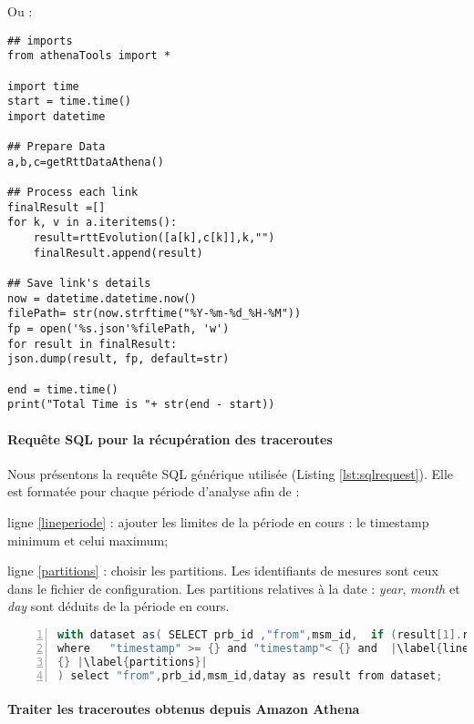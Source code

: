 \documentclass[]{report}
\begin{document}
Ou :
\begin{lstlisting}
## imports
from athenaTools import *

import time
start = time.time()
import datetime

## Prepare Data
a,b,c=getRttDataAthena()

## Process each link
finalResult =[]
for k, v in a.iteritems():
	result=rttEvolution([a[k],c[k]],k,"")
	finalResult.append(result)

## Save link's details
now = datetime.datetime.now()
filePath= str(now.strftime("%Y-%m-%d_%H-%M"))
fp = open('%s.json'%filePath, 'w')
for result in finalResult:
json.dump(result, fp, default=str)

end = time.time()
print("Total Time is "+ str(end - start))
\end{lstlisting}

\paragraph{Requête SQL pour la récupération des traceroutes} \label{sqlformat}

Nous présentons la requête SQL générique utilisée (Listing \ref{lst:sqlrequest}). Elle est formatée pour chaque période d'analyse afin de :
 
 ligne \ref{lineperiode} : ajouter les limites de la période en cours : le timestamp minimum et celui maximum;
 
 ligne \ref{partitions} : choisir les partitions. Les identifiants de mesures sont ceux dans le fichier de configuration. Les partitions relatives à la date : \textit{year}, \textit{month} et \textit{day} sont déduits de la période en cours.
\begin{lstlisting}[language=scala,firstnumber=1, caption={ Requête SQL dans Athena },label={lst:sqlrequest}, basicstyle = \footnotesize,escapechar=|,numbers=left,
stepnumber=1]
with dataset as( SELECT prb_id ,"from",msm_id,  if (result[1].result[1].err is  null and result[1].result is not null ,transform(result , x -> transform (x.result, entry->  Map(array[ if (entry."from" is not null, concat('"',cast(entry."from" as varchar),'"') , concat('"','none','"')) ],  array[if (entry."from" is not null ,entry."rtt" ,0)]  ))),array[])  as datay from traceroutes_api 
where   "timestamp" >= {} and "timestamp"< {} and  |\label{lineperiode}|
{} |\label{partitions}|
) select "from",prb_id,msm_id,datay as result from dataset;
\end{lstlisting}

\paragraph{Traiter les traceroutes obtenus depuis Amazon Athena}
\end{document}
